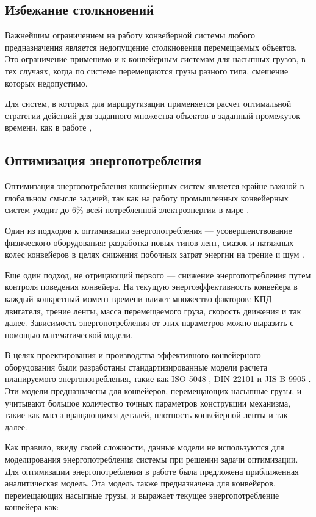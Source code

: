 \documentclass[specification,annotation,times]{itmo-student-thesis}
\theoremstyle{definition}
\begin{document}
\subsection{Избежание столкновений}

Важнейшим ограничением на работу конвейерной системы любого предназначения
является недопущение столкновения перемещаемых объектов. Это ограничение
применимо и к конвейерным системам для насыпных грузов, в тех случаях, когда по
системе перемещаются грузы разного типа, смешение которых недопустимо.

Для систем, в которых для маршрутизации применяется расчет оптимальной стратегии
действий для заданного множества объектов в заданный промежуток времени, как в
работе \cite{ago2007simultaneous}, 

\subsection{Оптимизация энергопотребления}

Оптимизация энергопотребления конвейерных систем является крайне важной в
глобальном смысле задачей, так как на работу промышленных конвейерных систем
уходит до 6\% всей потребленной электроэнергии в мире \cite{halepoto2016design}.

Один из подходов к оптимизации энергопотребления --- усовершенствование
физического оборудования: разработка новых типов лент, смазок и натяжных колес
конвейеров в целях снижения побочных затрат энергии на трение и шум
\cite{staniak1996energy}.

Еще один подход, не отрицающий первого --- снижение энергопотребления путем
контроля поведения конвейера. На текущую энергоэффективность конвейера в каждый
конкретный момент времени влияет множество факторов: КПД двигателя, трение
ленты, масса перемещаемого груза, скорость движения и так далее. Зависимость
энергопотребления от этих параметров можно выразить с помощью математической
модели.

В целях проектирования и производства эффективного конвейерного
оборудования были разработаны стандартизированные модели расчета планируемого
энергопотребления, такие как ISO 5048 \cite{ISO5048}, DIN 22101 \cite{DIN22101}
и JIS B 9905 \cite{JISB8805}. Эти модели предназначены для конвейеров,
перемещающих насыпные грузы, и учитывают большое количество точных параметров
конструкции механизма, такие как масса вращающихся деталей, плотность
конвейерной ленты и так далее.

Как правило, ввиду своей сложности, данные модели не используются для
моделирования энергопотребления системы при решении задачи оптимизации. Для
оптимизации энергопотребления в работе \cite{zhang2011modeling} была предложена
приближенная аналитическая модель. Эта модель также предназначена для
конвейеров, перемещающих насыпные грузы, и выражает текущее энергопотребление
конвейера как:
\end{document}
